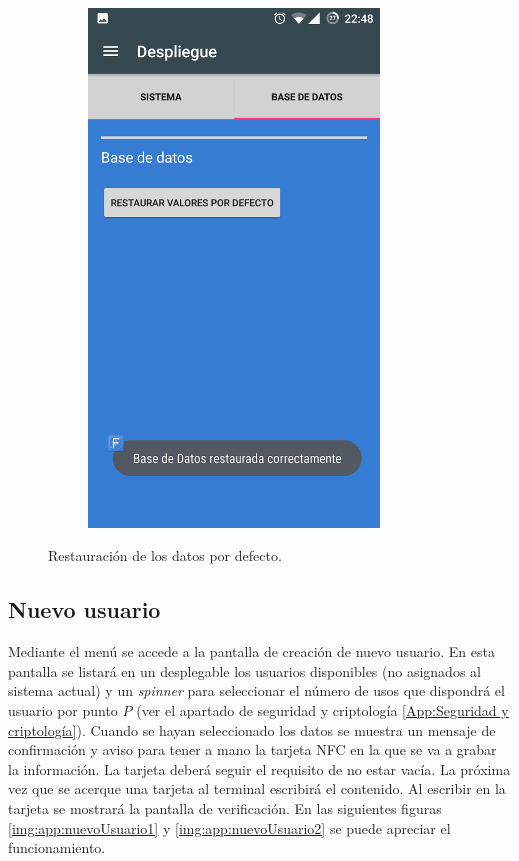 \documentclass[../PFC.tex]{subfiles}
\begin{document}
\begin{figure}[H]
\begin{subfigure}{0.4\textwidth}
       \includegraphics[width=0.85\textwidth]{./img/app/despliegueBaseDeDatosMensaje}
    \end{subfigure}   
  \caption{Restauración de los datos por defecto.}
  \label{img:app:baseDatos2}
\end{figure}

\subsection{Nuevo usuario}
\label{App:AD:Nuevo usuario}

Mediante el menú se accede a la pantalla de creación de nuevo usuario. En esta pantalla se listará en un desplegable los usuarios disponibles (no asignados al sistema actual) y un \textit{spinner} para seleccionar el número de usos que dispondrá el usuario por punto $P$ (ver el apartado de seguridad y criptología \ref{App:Seguridad y criptología}). Cuando se hayan seleccionado los datos se muestra un mensaje de confirmación y aviso para tener a mano la tarjeta NFC en la que se va a grabar la información. La tarjeta deberá seguir el requisito de no estar vacía. La próxima vez que se acerque una tarjeta al terminal escribirá el contenido. Al escribir en la tarjeta se mostrará la pantalla de verificación. En las siguientes figuras \ref{img:app:nuevoUsuario1} y \ref{img:app:nuevoUsuario2} se puede apreciar el funcionamiento.
\end{document}
